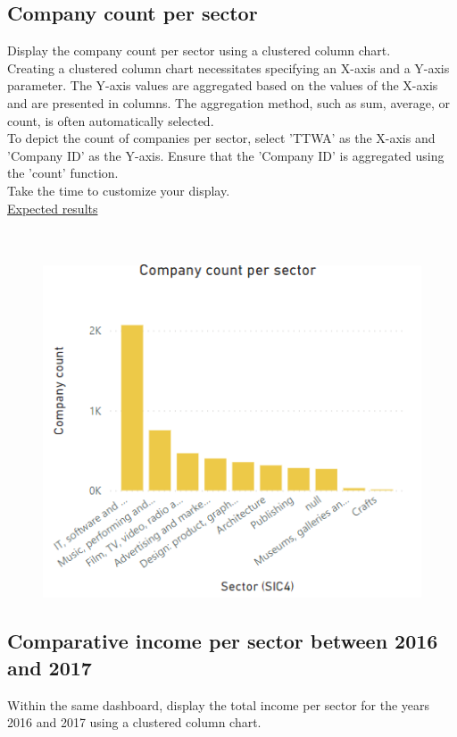 \documentclass[11pt]{article}
\begin{document}
\subsection{Company count per sector}

Display the company count per sector using a clustered column chart.\\

Creating a clustered column chart necessitates specifying an X-axis and a Y-axis parameter. The Y-axis values are aggregated based on the values of the X-axis and are presented in columns. The aggregation method, such as sum, average, or count, is often automatically selected.\\

To depict the count of companies per sector, select 'TTWA' as the X-axis and 'Company ID' as the Y-axis. Ensure that the 'Company ID' is aggregated using the 'count' function.\\

Take the time to customize your display.\\

\underline{Expected results}\\
\\
\\

\begin{figure}[h!]
    \centering
    \includegraphics[width=.4\linewidth]{img/companyPerSector.png}
\end{figure}

\subsection{Comparative income per sector between 2016 and 2017}

Within the same dashboard, display the total income per sector for the years 2016 and 2017 using a clustered column chart.\\
\end{document}
